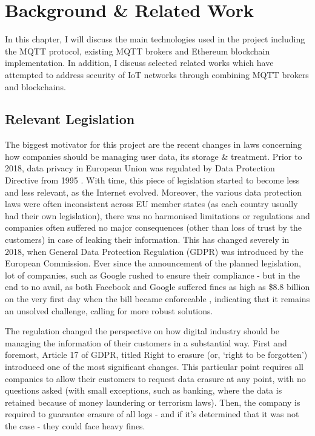 \chapter{Background \& Related Work}

In this chapter, I will discuss the main technologies used in the project including the MQTT protocol, existing MQTT brokers and Ethereum blockchain implementation. In addition, I discuss selected related works which have attempted to address security of IoT networks through combining MQTT brokers and blockchains.
\section{Relevant Legislation}
The biggest motivator for this project are the recent changes in laws concerning how companies should be managing user data, its storage \& treatment. Prior to 2018, data privacy in European Union was regulated by Data Protection Directive from 1995 \cite{directive199595}. With time, this piece of legislation started to become less and less relevant, as the Internet evolved. Moreover, the various data protection laws were often inconsistent across EU member states (as each country usually had their own legislation), there was no harmonised limitations or regulations and companies often suffered no major consequences (other than loss of trust by the customers) in case of leaking their information. This has changed severely in 2018, when General Data Protection Regulation (GDPR) \cite{EUdataregulations2018} was introduced by the European Commission. Ever since the announcement of the planned legislation, lot of companies, such as Google rushed to ensure their compliance - but in the end to no avail, as both Facebook and Google suffered fines as high as \$8.8 billion on the very first day when the bill became enforceable \citep{brandom2018facebook}, indicating that it remains an unsolved challenge, calling for more robust solutions.

The regulation changed the perspective on how digital industry should be managing the information of their customers in a substantial way. First and foremost, Article 17 of GDPR, titled Right to erasure (or, `right to be forgotten') introduced one of the most significant changes. This particular point requires all companies to allow their customers to request data erasure at any point, with no questions asked (with small exceptions, such as banking, where the data is retained because of money laundering or terrorism laws). Then, the company is required to guarantee erasure of all logs - and if it's determined that it was not the case - they could face heavy fines.

